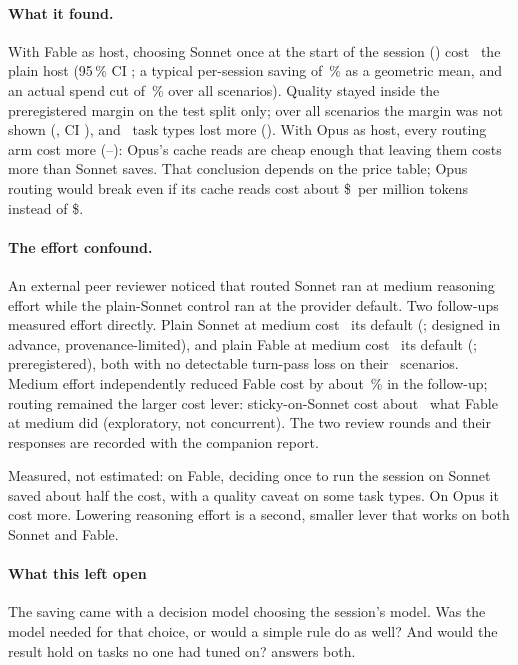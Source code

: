\paragraph{What it found.} With Fable as host, choosing Sonnet once at the start of the session ()
cost \CfFableStickyPairTwo\X\ the plain host (95\,\% CI \CfFableStickyPairCITwo; a typical per-session saving of
\CfFableStickySaving\,\% as a geometric mean, and an actual spend cut of \RvSpendCutAll\,\% over all scenarios). Quality
stayed inside the preregistered margin on the test split only; over all scenarios the margin was not shown
(\QAllFableSticky, CI \QAllFableStickyCI), and \RgNTaskFail\ task types lost more (\RgTaskFailList). With Opus as host,
every routing arm cost more (\CfOpusStickyPairTwo--\CfOpusSonnetPairTwo\X): Opus's cache reads are cheap enough that
leaving them costs more than Sonnet saves. That conclusion depends on the price table; Opus routing would break
even if its cache reads cost about \$\BEStickyPair\ per million tokens instead of \$\PriceOpusRead.

\paragraph{The effort confound.} An external peer reviewer noticed that routed Sonnet ran at medium reasoning effort
while the plain-Sonnet control ran at the provider default. Two follow-ups measured effort directly. Plain Sonnet at
medium cost \EcRatio\X\ its default (\EcCI; designed in advance, provenance-limited), and plain Fable at medium cost
\EfRatio\X\ its default (\EfCI; preregistered), both with no detectable turn-pass loss on their \EfScen\ scenarios. Medium effort
independently reduced Fable cost by about \EfCutPct\,\% in the follow-up; routing remained the larger cost lever: sticky-on-Sonnet cost about \EfStickyVsMedium\X\ what Fable at medium did (exploratory, not concurrent).
The two review rounds and their responses are recorded with the companion report.

\begin{keyidea}
Measured, not estimated: on Fable, deciding once to run the session on Sonnet saved about half the cost, with a
quality caveat on some task types. On Opus it cost more. Lowering reasoning effort is a second, smaller lever that
works on both Sonnet and Fable.
\end{keyidea}

\paragraph{What this left open} The saving came with a decision model choosing the session's model. Was the model
needed for that choice, or would a simple rule do as well? And would the result hold on tasks no one had tuned on?
 answers both.

